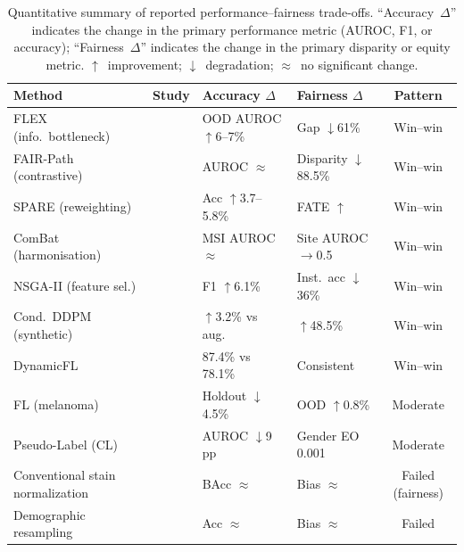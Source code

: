 \begin{table}[!ht]
  \centering
  \caption{Quantitative summary of reported performance--fairness
           trade-offs.  ``Accuracy~$\Delta$'' indicates the change in
           the primary performance metric (AUROC, F1, or accuracy);
           ``Fairness~$\Delta$'' indicates the change in the primary
           disparity or equity metric.
           $\uparrow$~improvement;
           $\downarrow$~degradation;
           $\approx$~no significant change.}
  \label{tab:tradeoffs}
  \small
  \begin{tabularx}{\linewidth}{@{}l l l l c@{}}
    \toprule
    \textbf{Method} & \textbf{Study} &
      \textbf{Accuracy $\Delta$} & \textbf{Fairness $\Delta$} &
      \textbf{Pattern} \\
    \midrule
    FLEX (info.\ bottleneck)
      & \citet{huang2025knowledge}
      & OOD AUROC $\uparrow$6--7\%
      & Gap $\downarrow$61\%
      & Win--win \\
    FAIR-Path (contrastive)
      & \citet{lin2025contrastive}
      & AUROC $\approx$
      & Disparity $\downarrow$88.5\%
      & Win--win \\
    SPARE (reweighting)
      & \citet{xu2026spare}
      & Acc $\uparrow$3.7--5.8\%
      & FATE $\uparrow$
      & Win--win \\
    ComBat (harmonisation)
      & \citet{murchan2024combat}
      & MSI AUROC $\approx$
      & Site AUROC $\to$0.5
      & Win--win \\
    NSGA-II (feature sel.)
      & \citet{bidgoli2022bias}
      & F1 $\uparrow$6.1\%
      & Inst.\ acc $\downarrow$36\%
      & Win--win \\
    Cond.\ DDPM (synthetic)
      & \citet{ktena2024generative}
      & $\uparrow$3.2\% vs aug.
      & $\uparrow$48.5\%
      & Win--win \\
    DynamicFL
      & \citet{zhang2025dynamicfl}
      & 87.4\% vs 78.1\%
      & Consistent
      & Win--win \\
    FL (melanoma)
      & \citet{haggenmuller2024federated}
      & Holdout $\downarrow$4.5\%
      & OOD $\uparrow$0.8\%
      & Moderate \\
    Pseudo-Label (CL)
      & \citet{cecconi2024fairness}
      & AUROC $\downarrow$9\,pp
      & Gender EO 0.001
      & Moderate \\
    Conventional stain normalization
      & \citet{voon2023evaluating}
      & BAcc $\approx$
      & Bias $\approx$
      & Failed (fairness) \\
    Demographic resampling
      & \citet{soltan2024challenges}
      & Acc $\approx$
      & Bias $\approx$
      & Failed \\
    \bottomrule
  \end{tabularx}
\end{table}

